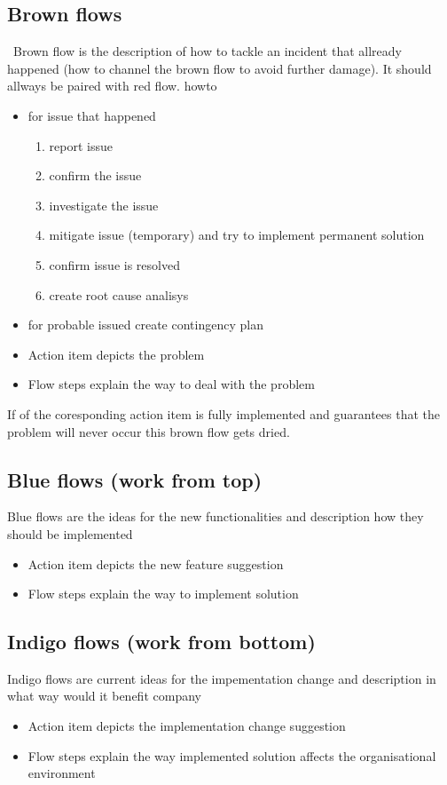 \subsection{Brown flows}\label{philo:brown:flow}\
Brown flow is the description of how to tackle an incident that allready happened (how to channel the brown flow to avoid further damage). It should allways be paired with red flow.
howto
\begin{itemize}
  \item for issue that happened
\begin{enumerate}
  \item report issue
  \item confirm the issue
  \item investigate the issue
  \item mitigate issue (temporary) and try to implement permanent solution
  \item confirm issue is resolved
  \item create root cause analisys
\end{enumerate}
\item for probable issued create contingency plan
\end{itemize}
\begin{itemize}
  \item Action item depicts the problem 
  \item Flow steps explain the way to deal with the problem
\end{itemize}
If  of the coresponding action item is fully implemented and guarantees that the problem will never occur this brown flow gets dried.

\subsection{Blue flows (work from top)}\label{philo:blue:flow}
Blue flows are the ideas for the new functionalities and description how they should be implemented
\begin{itemize}
  \item Action item depicts the new feature suggestion 
  \item Flow steps explain the way to implement solution
\end{itemize}
\subsection{Indigo flows (work from bottom)}\label{philo:indigo:flow}
Indigo flows are current ideas for the impementation change and description in what way would it benefit company
\begin{itemize}
  \item Action item depicts the implementation change suggestion 
  \item Flow steps explain the way implemented solution affects the organisational environment
\end{itemize}
